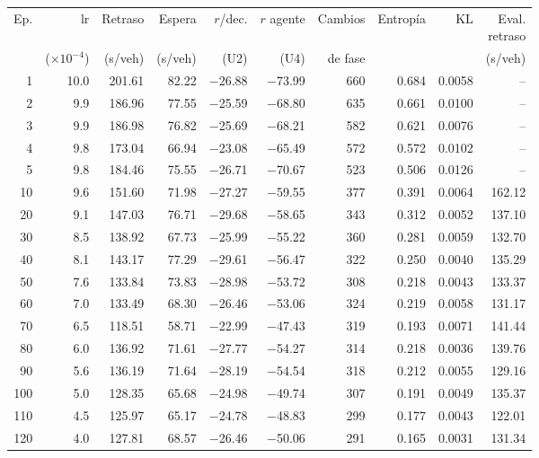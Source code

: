 \begin{table}[H]
\centering
\scriptsize
\setlength{\tabcolsep}{3pt}
\setlength{\tabcolsep}{2pt}
\begin{tabular}{rrrrrrrrrr}
\toprule
Ep. & lr & Retraso & Espera & $r$/dec. & $r$ agente & Cambios & Entropía & KL & \makecell{Eval.\\retraso} \\
 & ($\times 10^{-4}$) & (s/veh) & (s/veh) & (U2) & (U4) & de fase &  &  & (s/veh) \\
\midrule
1 & 10.0 & 201.61 & 82.22 & $-$26.88 & $-$73.99 & 660 & 0.684 & 0.0058 & -- \\
2 & 9.9 & 186.96 & 77.55 & $-$25.59 & $-$68.80 & 635 & 0.661 & 0.0100 & -- \\
3 & 9.9 & 186.98 & 76.82 & $-$25.69 & $-$68.21 & 582 & 0.621 & 0.0076 & -- \\
4 & 9.8 & 173.04 & 66.94 & $-$23.08 & $-$65.49 & 572 & 0.572 & 0.0102 & -- \\
5 & 9.8 & 184.46 & 75.55 & $-$26.71 & $-$70.67 & 523 & 0.506 & 0.0126 & -- \\
10 & 9.6 & 151.60 & 71.98 & $-$27.27 & $-$59.55 & 377 & 0.391 & 0.0064 & 162.12 \\
20 & 9.1 & 147.03 & 76.71 & $-$29.68 & $-$58.65 & 343 & 0.312 & 0.0052 & 137.10 \\
30 & 8.5 & 138.92 & 67.73 & $-$25.99 & $-$55.22 & 360 & 0.281 & 0.0059 & 132.70 \\
40 & 8.1 & 143.17 & 77.29 & $-$29.61 & $-$56.47 & 322 & 0.250 & 0.0040 & 135.29 \\
50 & 7.6 & 133.84 & 73.83 & $-$28.98 & $-$53.72 & 308 & 0.218 & 0.0043 & 133.37 \\
60 & 7.0 & 133.49 & 68.30 & $-$26.46 & $-$53.06 & 324 & 0.219 & 0.0058 & 131.17 \\
70 & 6.5 & 118.51 & 58.71 & $-$22.99 & $-$47.43 & 319 & 0.193 & 0.0071 & 141.44 \\
80 & 6.0 & 136.92 & 71.61 & $-$27.77 & $-$54.27 & 314 & 0.218 & 0.0036 & 139.76 \\
90 & 5.6 & 136.19 & 71.64 & $-$28.19 & $-$54.54 & 318 & 0.212 & 0.0055 & 129.16 \\
100 & 5.0 & 128.35 & 65.68 & $-$24.98 & $-$49.74 & 307 & 0.191 & 0.0049 & 135.37 \\
110 & 4.5 & 125.97 & 65.17 & $-$24.78 & $-$48.83 & 299 & 0.177 & 0.0043 & 122.01 \\
120 & 4.0 & 127.81 & 68.57 & $-$26.46 & $-$50.06 & 291 & 0.165 & 0.0031 & 131.34 \\

\end{tabular}
\end{table}
